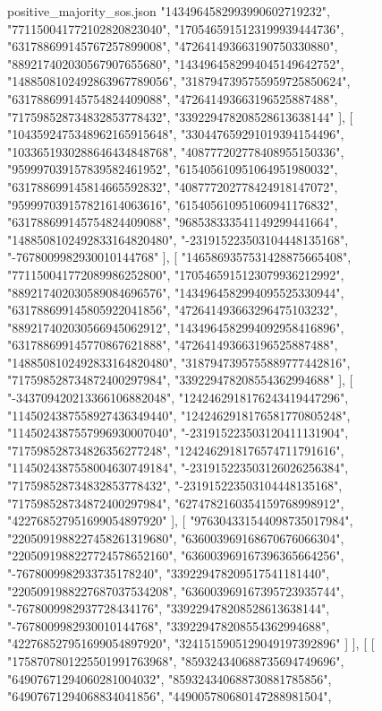 \begin{filecontents*}[overwrite]{positive_majority_sos.json}
    "1434964582993990602719232",
    "771150041772102820823040",
    "1705465915123199939444736",
    "631788699145767257899008",
    "472641493663190750330880",
    "889217402030567907655680",
    "1434964582994045149642752",
    "1488508102492863967789056",
    "3187947395755959725850624",
    "631788699145754824409088",
    "472641493663196525887488",
    "717598528734832853778432",
    "339229478208528613638144"
   ],
   [
    "1043592475348962165915648",
    "330447659291019394154496",
    "1033651930288646434848768",
    "408777202778408955150336",
    "959997039157839582461952",
    "615405610951064951980032",
    "631788699145814665592832",
    "408777202778424918147072",
    "959997039157821614063616",
    "615405610951060941176832",
    "631788699145754824409088",
    "968538333541149299441664",
    "1488508102492833164820480",
    "-231915223503104448135168",
    "-7678009982930010144768"
   ],
   [
    "1465869357531428875665408",
    "771150041772089986252800",
    "1705465915123079936212992",
    "889217402030589084696576",
    "1434964582994095525330944",
    "631788699145805922041856",
    "472641493663296475103232",
    "889217402030566945062912",
    "1434964582994092958416896",
    "631788699145770867621888",
    "472641493663196525887488",
    "1488508102492833164820480",
    "3187947395755889777442816",
    "717598528734872400297984",
    "339229478208554362994688"
   ],
   [
    "-343709420213366106882048",
    "1242462918176243419447296",
    "1145024387558927436349440",
    "1242462918176581770805248",
    "1145024387557996930007040",
    "-231915223503120411131904",
    "717598528734826356277248",
    "1242462918176574711791616",
    "1145024387558004630749184",
    "-231915223503126026256384",
    "717598528734832853778432",
    "-231915223503104448135168",
    "717598528734872400297984",
    "6274782160354159768998912",
    "422768527951699054897920"
   ],
   [
    "976304331544098735017984",
    "2205091988227458261319680",
    "636003969168670676066304",
    "2205091988227724578652160",
    "636003969167396365664256",
    "-7678009982933735178240",
    "339229478209517541181440",
    "2205091988227687037534208",
    "636003969167395723935744",
    "-7678009982937728434176",
    "339229478208528613638144",
    "-7678009982930010144768",
    "339229478208554362994688",
    "422768527951699054897920",
    "3241515905129049197392896"
   ]
  ],
  [
   [
    "1758707801225501991763968",
    "859324340688735694749696",
    "64907671294060281004032",
    "859324340688730881785856",
    "64907671294068834041856",
    "449005780680147288981504",

\end{filecontents*}
